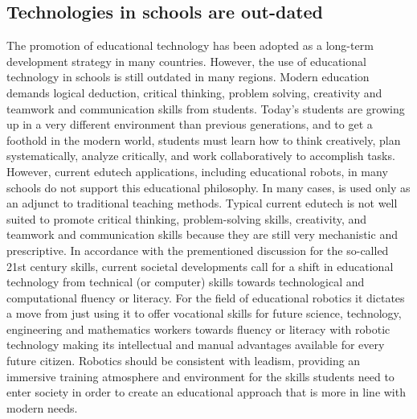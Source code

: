 \documentclass[a4paper,11pt]{article}
\begin{document}
\subsection{Technologies in schools are out-dated}
The promotion of educational technology has been adopted as a long-term development strategy in many countries. However, the use of educational technology in schools is still outdated in many regions. Modern education demands logical deduction, critical thinking, problem solving, creativity and teamwork and communication skills from students\cite{alimisis2012robotics}. Today's students are growing up in a very different environment than previous generations, and to get a foothold in the modern world, students must learn how to think creatively, plan systematically, analyze critically, and work collaboratively to accomplish tasks. However, current edutech applications, including educational robots, in many schools do not support this educational philosophy. In many cases,  is used only as an adjunct to traditional teaching methods. Typical current edutech is not well suited to promote critical thinking, problem-solving skills, creativity, and teamwork and communication skills because they are still very mechanistic and prescriptive. In accordance with the prementioned discussion for the so-called 21st century skills, current societal developments call for a shift in educational technology from technical (or computer) skills towards technological and computational fluency or literacy. For the field of educational robotics it dictates a move from just using it to offer vocational skills for future science, technology, engineering and mathematics workers towards fluency or literacy with robotic technology making its intellectual and manual advantages available for every future citizen. Robotics should be consistent with leadism, providing an immersive training atmosphere and environment for the skills students need to enter society in order to create an educational approach that is more in line with modern needs.
\end{document}
